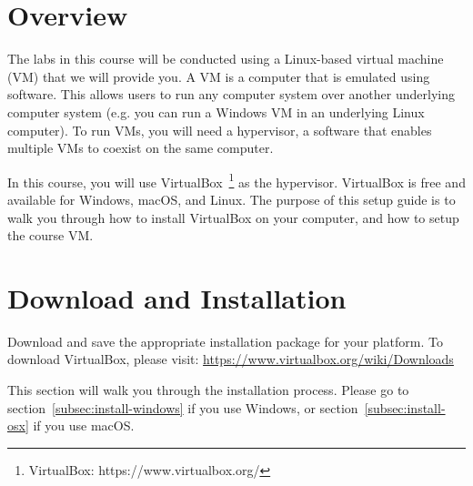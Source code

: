\documentclass[11pt]{article}
\begin{document}
\maketitle \thispagestyle{fancy}



\section{Overview}
\label{sec:overview}
The labs in this course will be conducted using a Linux-based virtual machine (VM) that we will provide you. A VM is a computer that is emulated using software. This allows users to run any computer system over another underlying computer system (e.g. you can run a Windows VM in an underlying Linux computer). To run VMs, you will need a hypervisor, a software that enables multiple VMs to coexist on the same computer.

In this course, you will use VirtualBox~\footnote{VirtualBox: https://www.virtualbox.org/} as the hypervisor. VirtualBox is free and available for Windows, macOS, and Linux. The purpose of this setup guide is to walk you through how to install VirtualBox on your computer, and how to setup the course VM.


\section{Download and Installation}
\label{sec:download}
Download and save the appropriate installation package for your platform. To download VirtualBox, please visit: \url{https://www.virtualbox.org/wiki/Downloads}

This section will walk you through the installation process. Please go to section~\ref{subsec:install-windows} if you use Windows, or section~\ref{subsec:install-osx} if you use macOS.

\end{document}
